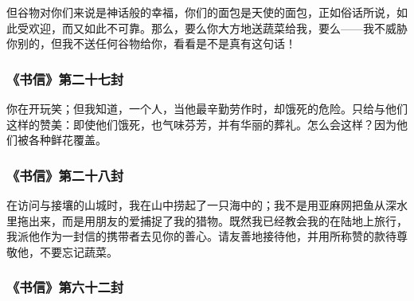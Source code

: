 但谷物对你们来说是神话般的幸福，你们的面包是天使的面包，正如俗话所说，如此受欢迎，而又如此不可靠。那么，要么你大方地送蔬菜给我，要么——我不威胁你别的，但我不送任何谷物给你，看看是不是真有这句话！\par


\subsubsection{《书信》第二十七封}

你在开玩笑；但我知道，一个人，当他最辛勤劳作时，却饿死的危险。只给与他们这样的赞美：即使他们饿死，也气味芬芳，并有华丽的葬礼。怎么会这样？因为他们被各种鲜花覆盖。\par


\subsubsection{《书信》第二十八封}

在访问与接壤的山城时，我在山中捞起了一只海中的；我不是用亚麻网把鱼从深水里拖出来，而是用朋友的爱捕捉了我的猎物。既然我已经教会我的在陆地上旅行，我派他作为一封信的携带者去见你的善心。请友善地接待他，并用所称赞的款待尊敬他，不要忘记蔬菜。\par


\subsubsection{《书信》第六十二封}

\par

